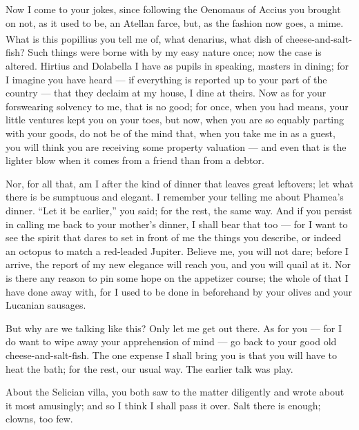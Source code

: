  Now I come to your jokes, since following the Oenomaus of Accius you brought on not, as it used to be, an Atellan farce, but, as the fashion now goes, a mime. What is this \textsuperscript{\textdagger}popillius\textsuperscript{\textdagger} you tell me of, what \textsuperscript{\textdagger}denarius\textsuperscript{\textdagger}, what dish of cheese-and-salt-fish? Such things were borne with by my easy nature once; now the case is altered. Hirtius and Dolabella I have as pupils in speaking, masters in dining; for I imagine you have heard --- if everything is reported up to your part of the country --- that they declaim at my house, I dine at theirs. Now as for your forswearing solvency to me, that is no good; for once, when you had means, your little ventures kept you on your toes, but now, when you are so equably parting with your goods, do not be of the mind that, when you take me in as a guest, you will think you are receiving some property valuation --- and even that is the lighter blow when it comes from a friend than from a debtor.

 Nor, for all that, am I after the kind of dinner that leaves great leftovers; let what there is be sumptuous and elegant. I remember your telling me about Phamea's dinner. ``Let it be earlier,'' you said; for the rest, the same way. And if you persist in calling me back to your mother's dinner, I shall bear that too --- for I want to see the spirit that dares to set in front of me the things you describe, or indeed an octopus to match a red-leaded Jupiter. Believe me, you will not dare; before I arrive, the report of my new elegance will reach you, and you will quail at it. Nor is there any reason to pin some hope on the appetizer course; the whole of that I have done away with, for I used to be done in beforehand by your olives and your Lucanian sausages.

 But why are we talking like this? Only let me get out there. As for you --- for I do want to wipe away your apprehension of mind --- go back to your good old cheese-and-salt-fish. The one expense I shall bring you is that you will have to heat the bath; for the rest, our usual way. The earlier talk was play.

 About the Selician villa, you both saw to the matter diligently and wrote about it most amusingly; and so I think I shall pass it over. Salt there is enough; clowns, too few.
